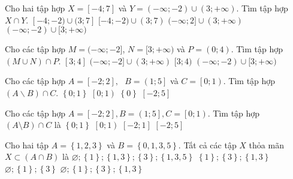 \begin{ex}%
	Cho hai tập hợp $X=[-4;7]$ và $Y=(-\infty;-2) \cup (3;+\infty)$. Tìm tập hợp $X \cap Y $.
	\choice
	{\True $[-4;-2)\cup (3;7]$}
	{$[-4;-2)\cup (3;7)$}
	{$(-\infty;2]\cup (3;+\infty)$}
	{$(-\infty;-2)\cup [3;+\infty)$}
\end{ex}


\begin{ex}%
	Cho các tập hợp $M=(-\infty;-2]$, $N=[3;+\infty)$ và $P=(0;4)$. Tìm tập hợp $(M \cup N)\cap P$. 
	\choice
	{$[3;4]$}
	{$(-\infty;-2]\cup (3;+\infty)$}
	{\True $[3;4)$}
	{$(-\infty;-2)\cup [3;+\infty)$}
	\loigiai{
		Ta có $(M \cup N)\cap P=((-\infty;-2]\cap (0;4))\cup ([3;+\infty)\cap (0;4))=[3;4)$.
	}
\end{ex}

\begin{ex}%
	Cho các tập hợp $A=\left[ -2;2 \right],\text{ }B=\left( 1;5 \right]$ và $C=\left[ 0;1 \right)$. Tìm tập hợp $\left( A\backslash B \right)\cap C$. 
	\choice
	{$\left\{ 0;1 \right\}$}
	{\True $\left[ 0;1 \right)$}
	{$\left\{ 0 \right\}$}
	{$\left[ -2;5 \right]$}
	\loigiai{
		Ta có $A\backslash B=[-2;1]\Rightarrow$ $\left( A\backslash B \right)\cap C=[-2;1]\cap [0;1)=[0;1)$.
	}
\end{ex}


\begin{ex}%
	Cho các tập hợp $A = \left[-2; 2\right], B = \left(1; 5\right], C = \left[0; 1\right)$. Tìm tập hợp $\left(A \setminus B\right) \cap C$ là
	\choice
	{$\left\{0; 1\right\}$}
	{\True $\left[0; 1\right)$}
	{$\left[-2; 1\right]$}
	{$\left[-2; 5\right]$}
	\loigiai{
		Ta có $A\backslash B=[-2;1]\Rightarrow$ $\left( A\backslash B \right)\cap C=[-2;1]\cap [0;1)=[0;1)$.
	}
\end{ex}

\begin{ex}%
	Cho hai tập $A = \left\{1, 2, 3\right\}$ và $B = \left\{0, 1, 3, 5\right\}$. Tất cả các tập $X$ thỏa mãn $X \subset \left( A \cap B \right)$ là
	\choice
	{$\varnothing; \left\{1\right\}; \left\{1, 3\right\}; \left\{3\right\}; \left\{1, 3, 5\right\}$}
	{$\left\{1\right\}; \left\{3\right\}; \left\{1, 3\right\}$}
	{$\varnothing; \left\{1\right\}; \left\{3\right\}$}
	{\True $\varnothing; \left\{1\right\}; \left\{3\right\}; \left\{1, 3\right\}$}
\end{ex}

